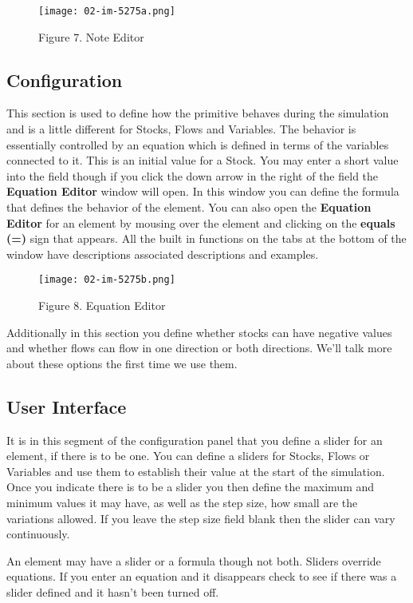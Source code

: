 \documentclass[]{memoir}
\let\Oldincludegraphics\includegraphics
\renewcommand{\includegraphics}[1]{\Oldincludegraphics[max size={\textwidth}{\textheight}]{#1}}
\renewcommand{\u}[1]{\textbf{#1}}
\begin{document}
\begin{figure}[htbp]
\centering
\texttt{[image: 02-im-5275a.png]}
\caption{Figure 7. Note Editor}
\end{figure}

\subsection{Configuration}

This section is used to define how the primitive behaves during the
simulation and is a little different for Stocks, Flows and Variables.
The behavior is essentially controlled by an equation which is defined
in terms of the variables connected to it. This is an initial value for
a Stock. You may enter a short value into the field though if you click
the down arrow in the right of the field the \u{Equation Editor} window
will open. In this window you can define the formula that defines the
behavior of the element. You can also open the \u{Equation Editor} for
an element by mousing over the element and clicking on the
\u{equals (=)} sign that appears. All the built in functions on the tabs
at the bottom of the window have descriptions associated descriptions
and examples.

\begin{figure}[htbp]
\centering
\texttt{[image: 02-im-5275b.png]}
\caption{Figure 8. Equation Editor}
\end{figure}

Additionally in this section you define whether stocks can have negative
values and whether flows can flow in one direction or both directions.
We'll talk more about these options the first time we use them.

\subsection{User Interface}

It is in this segment of the configuration panel that you define a
slider for an element, if there is to be one. You can define a sliders
for Stocks, Flows or Variables and use them to establish their value at
the start of the simulation. Once you indicate there is to be a slider
you then define the maximum and minimum values it may have, as well as
the step size, how small are the variations allowed. If you leave the
step size field blank then the slider can vary continuously.

An element may have a slider or a formula though not both. Sliders
override equations. If you enter an equation and it disappears check to
see if there was a slider defined and it hasn't been turned off.
\end{document}
